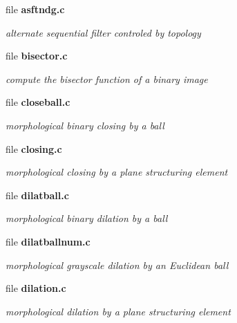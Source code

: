 \begin{CompactItemize}
\item 
file {\bf asftndg.c}
\begin{CompactList}\small\item\em alternate sequential filter controled by topology \item\end{CompactList}

\item 
file {\bf bisector.c}
\begin{CompactList}\small\item\em compute the bisector function of a binary image \item\end{CompactList}

\item 
file {\bf closeball.c}
\begin{CompactList}\small\item\em morphological binary closing by a ball \item\end{CompactList}

\item 
file {\bf closing.c}
\begin{CompactList}\small\item\em morphological closing by a plane structuring element \item\end{CompactList}

\item 
file {\bf dilatball.c}
\begin{CompactList}\small\item\em morphological binary dilation by a ball \item\end{CompactList}

\item 
file {\bf dilatballnum.c}
\begin{CompactList}\small\item\em morphological grayscale dilation by an Euclidean ball \item\end{CompactList}

\item 
file {\bf dilation.c}
\begin{CompactList}\small\item\em morphological dilation by a plane structuring element \item\end{CompactList}


\end{CompactItemize}
